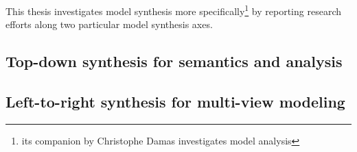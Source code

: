 This thesis investigates model synthesis more specifically\footnote{its companion by Christophe Damas \cite{Damas:2011} investigates model analysis} by reporting research efforts along two particular model synthesis axes.

\subsection{Top-down synthesis for semantics and analysis}

\subsection{Left-to-right synthesis for multi-view modeling} 




